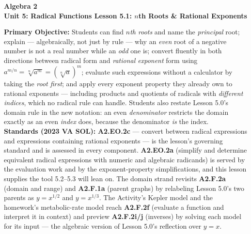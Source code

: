 \documentclass[10pt]{article}
\newcommand{\CourseName}{Algebra 2}
\newcommand{\UnitNumberName}{Unit 5: Radical Functions \quad}
\newcommand{\LessonNumberName}{Lesson 5.1: $n$th Roots \& Rational Exponents}
\begin{document}
\begin{center}
    {\Large\bfseries \CourseName \\
    {\small\bfseries \UnitNumberName \LessonNumberName}}
\end{center}

\begin{tcolorbox}[colback=forestbg, colframe=forest, boxrule=0.9pt, arc=2mm,
    left=2mm, right=2mm, top=1.5mm, bottom=1.5mm]
    \textbf{Primary Objective:} Students can find \emph{$n$th roots} and name the \emph{principal}
    root; explain --- algebraically, not just by rule --- why an \emph{even} root of a negative
    number is not a real number while an \emph{odd} one is; convert fluently in both directions
    between radical form and \emph{rational exponent} form using
    $a^{m/n}=\sqrt[n]{a^{m}}=\left(\sqrt[n]{a}\right)^{m}$; evaluate such expressions without a
    calculator by taking the \emph{root first}; and apply every exponent property they already own
    to rational exponents --- including products and quotients of radicals with \emph{different
    indices}, which no radical rule can handle. Students also restate Lesson 5.0's domain rule in the
    new notation: an even \emph{denominator} restricts the domain exactly as an even \emph{index}
    does, because the denominator \emph{is} the index.
    \\[2pt]
    \textbf{Standards (2023 VA SOL):} \textbf{A2.EO.2c} --- convert between radical expressions and
    expressions containing rational exponents --- is the lesson's governing standard and is assessed
    in every component. \textbf{A2.EO.2a} (simplify and determine equivalent radical expressions
    with numeric and algebraic radicands) is served by the evaluation work and by the exponent-property
    simplifications, and this lesson supplies the tool 5.2--5.3 will lean on. The domain strand
    revisits \textbf{A2.F.2a} (domain and range) and \textbf{A2.F.1a} (parent graphs) by relabeling
    Lesson 5.0's two parents as $y=x^{1/2}$ and $y=x^{1/3}$. The Activity's Kepler model and the
    homework's metabolic-rate model reach \textbf{A2.F.2f} (evaluate a function and interpret it in
    context) and preview \textbf{A2.F.2i/j} (inverses) by solving each model for its input --- the
    algebraic version of Lesson 5.0's reflection over $y=x$.
\end{tcolorbox}
\end{document}
